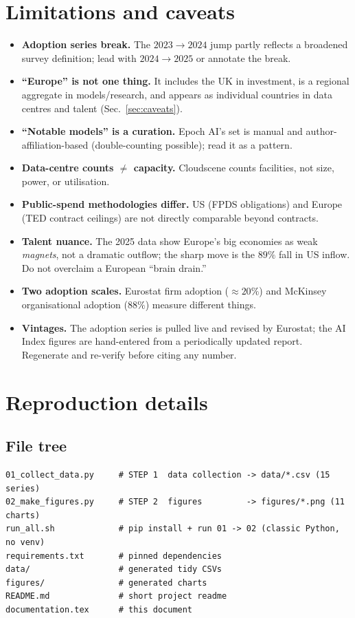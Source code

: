\documentclass[11pt,a4paper]{article}
\begin{document}
\section{Limitations and caveats}\label{sec:limits}
\begin{itemize}
  \item \textbf{Adoption series break.} The $2023\to 2024$ jump partly reflects a
  broadened survey definition; lead with $2024\to 2025$ or annotate the break.
  \item \textbf{``Europe'' is not one thing.} It includes the UK in investment,
  is a regional aggregate in models/research, and appears as individual countries
  in data centres and talent (Sec.~\ref{sec:caveats}).
  \item \textbf{``Notable models'' is a curation.} Epoch AI's set is manual and
  author-affiliation-based (double-counting possible); read it as a pattern.
  \item \textbf{Data-centre counts $\ne$ capacity.} Cloudscene counts facilities,
  not size, power, or utilisation.
  \item \textbf{Public-spend methodologies differ.} US (FPDS obligations) and
  Europe (TED contract ceilings) are not directly comparable beyond contracts.
  \item \textbf{Talent nuance.} The 2025 data show Europe's big economies as weak
  \emph{magnets}, not a dramatic outflow; the sharp move is the $89\%$ fall in US
  inflow. Do not overclaim a European ``brain drain.''
  \item \textbf{Two adoption scales.} Eurostat firm adoption ($\approx 20\%$) and
  McKinsey organisational adoption ($88\%$) measure different things.
  \item \textbf{Vintages.} The adoption series is pulled live and revised by
  Eurostat; the AI Index figures are hand-entered from a periodically updated
  report. Regenerate and re-verify before citing any number.
\end{itemize}

\appendix
\section{Reproduction details}

\subsection{File tree}
\begin{lstlisting}
01_collect_data.py     # STEP 1  data collection -> data/*.csv (15 series)
02_make_figures.py     # STEP 2  figures         -> figures/*.png (11 charts)
run_all.sh             # pip install + run 01 -> 02 (classic Python, no venv)
requirements.txt       # pinned dependencies
data/                  # generated tidy CSVs
figures/               # generated charts
README.md              # short project readme
documentation.tex      # this document
\end{lstlisting}
\end{document}
